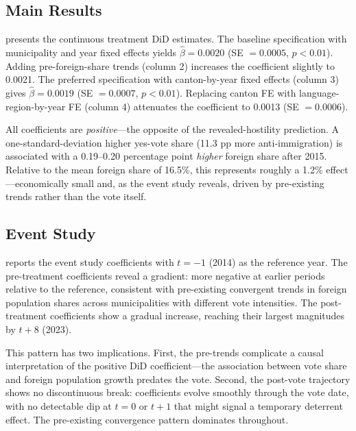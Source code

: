 \documentclass[12pt]{article}
\begin{document}
\subsection{Main Results}

 presents the continuous treatment DiD estimates. The baseline specification with municipality and year fixed effects yields $\hat{\beta} = 0.0020$ (SE $= 0.0005$, $p < 0.01$). Adding pre-foreign-share trends (column 2) increases the coefficient slightly to 0.0021. The preferred specification with canton-by-year fixed effects (column 3) gives $\hat{\beta} = 0.0019$ (SE $= 0.0007$, $p < 0.01$). Replacing canton FE with language-region-by-year FE (column 4) attenuates the coefficient to 0.0013 (SE $= 0.0006$).

All coefficients are \textit{positive}---the opposite of the revealed-hostility prediction. A one-standard-deviation higher yes-vote share (11.3 pp more anti-immigration) is associated with a 0.19--0.20 percentage point \textit{higher} foreign share after 2015. Relative to the mean foreign share of 16.5\%, this represents roughly a 1.2\% effect---economically small and, as the event study reveals, driven by pre-existing trends rather than the vote itself.



\subsection{Event Study}

 reports the event study coefficients with $t = -1$ (2014) as the reference year. The pre-treatment coefficients reveal a gradient: more negative at earlier periods relative to the reference, consistent with pre-existing convergent trends in foreign population shares across municipalities with different vote intensities. The post-treatment coefficients show a gradual increase, reaching their largest magnitudes by $t + 8$ (2023).

This pattern has two implications. First, the pre-trends complicate a causal interpretation of the positive DiD coefficient---the association between vote share and foreign population growth predates the vote. Second, the post-vote trajectory shows no discontinuous break: coefficients evolve smoothly through the vote date, with no detectable dip at $t = 0$ or $t + 1$ that might signal a temporary deterrent effect. The pre-existing convergence pattern dominates throughout.
\end{document}
